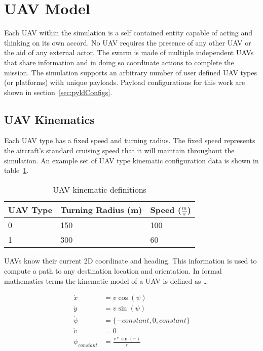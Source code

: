 \section{UAV Model}
Each UAV within the simulation is a self contained entity capable of acting and thinking on its own accord.  No UAV requires the presence of any other UAV or the aid of any external actor.  The swarm is made of multiple independent UAVs that share information and in doing so coordinate actions to complete the mission.  The simulation supports an arbitrary number of user defined UAV types (or platforms) with unique payloads.  Payload configurations for this work are shown in section~\ref{sec:pyldConfigs}.


\subsection{UAV Kinematics}
Each UAV type has a fixed speed and turning radius.  The fixed speed represents the aircraft's standard cruising speed that it will maintain throughout the simulation.  An example set of UAV type kinematic configuration data is shown in table~\ref{tab:uavKinematic}.

\begin{table}[H]
	\caption{UAV kinematic definitions}
	\centering
	\label{tab:uavKinematic}
	\begin{tabular}{|p{1cm}|p{2cm}|p{1cm}|}
		\hline
		UAV Type & Turning Radius (m) & Speed ($\frac{m}{s}$)\\ \hline
		0 & 150 & 100 \\
		1 & 300 & 60 \\
		\hline
	\end{tabular}
\end{table}

UAVs know their current 2D coordinate and heading.  This information is used to compute a path to any destination location and orientation.  In formal mathematics terms the kinematic model of a UAV is defined as \dots

\begin{align}
\dot{x} &= v \cos(\psi) \label{eq:uavChngX}\\
\dot{y} &= v \sin(\psi) \label{eq:uavChngY}\\
\dot{\psi} &= \{-constant, 0, constant\} \label{eq:uavTurnRate}\\
\dot{v} &= 0 \label{eq:uavAccel}\\
\psi_{constant} &= \frac{v*\sin(\pi)}{r} \label{eq:uavTurnRateDeriv}
\end{align}

